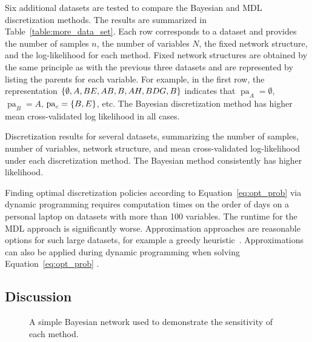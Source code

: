\documentclass[twoside,11pt]{article}
\newcommand{\citep}[1]{\cite{#1}}
\newcommand{\curly}[1]{\mathopen{}\mathclose\bgroup\left\{#1\aftergroup\egroup\right\}}
\DeclareMathOperator{\Pa}{pa} %
\begin{document}
Six additional datasets \citep{Lichman_2013} are tested to compare the Bayesian and MDL discretization methods.
The results are summarized in Table~\ref{table:more_data_set}.
Each row corresponds to a dataset and provides the number of samples $n$, the number of variables $N$, the fixed network structure, and the log-likelihood for each method.
Fixed network structures are obtained by the same principle as with the previous three datasets and are represented by listing the parents for each variable.
For example, in the first row, the representation $\curly{\emptyset,A,BE,AB,B,AH,BDG,B}$ indicates that $\Pa_A = \emptyset$, $\Pa_B = A$, $\Pa_c = \curly{B,E}$, etc.
The Bayesian discretization method has higher mean cross-validated log likelihood in all cases.

\begin{table}[ht]
	\centering
	\caption{
		Discretization results for several datasets, summarizing the number of samples, number of variables, network structure, and mean cross-validated log-likelihood under each discretization method.
    The Bayesian method consistently has higher likelihood.
	}
  \resizebox{\textwidth}{!}{
	 
  }
	\label{table:more_data_set}
\end{table}

Finding optimal discretization policies according to Equation~\ref{eq:opt_prob} via dynamic programming requires computation times on the order of days on a personal laptop on datasets with more than \num{100} variables.
The runtime for the MDL approach is significantly worse.
Approximation approaches are reasonable options for such large datasets, for example a greedy heuristic~\citep{Friedman_1996}.
Approximations can also be applied during dynamic programming when solving Equation~\ref{eq:opt_prob} \citep{Boulle_2006}.

\subsection{Discussion}
\label{subsec:discuss_exp}

\begin{figure}[ht]
  \centering
  
  \caption{A simple Bayesian network used to demonstrate the sensitivity of each method.}
  \label{fig:exp_discuss}
\end{figure}
\end{document}
